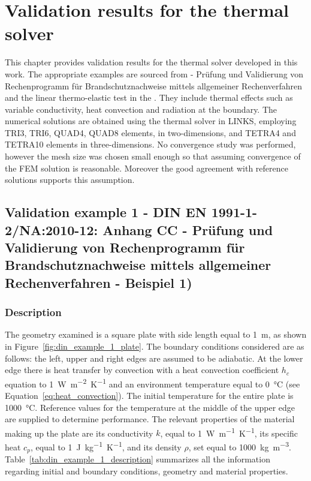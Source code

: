\chapter{Validation results for the thermal solver} \label{ch:val_therm_solver}

This chapter provides validation results for the thermal solver developed in this work.
The appropriate examples are sourced from \cite{DINEN1991_1_2}  - Prüfung und  Validierung von Rechenprogramm für Brand\-schutz\-nach\-weise mittels allgemeiner Rechenverfahren  and the linear thermo-elastic test in the \cite{NAFEMSbenchmarks}.
They include thermal effects such as variable conductivity, heat convection and radiation at the boundary.
The numerical solutions are obtained using the thermal solver in LINKS, employing TRI3, TRI6, QUAD4, QUAD8 elements, in two-dimensions, and TETRA4 and TETRA10 elements in three-dimensions.
No convergence study was performed, however the mesh size was chosen small enough so that assuming convergence of the FEM solution is reasonable.
Moreover the good agreement with reference solutions supports this assumption.

\section{Validation example 1 - DIN EN 1991-1-2/NA:2010-12: Anhang CC - Prüfung und Validierung von Rechenprogramm für Brandschutznachweise mittels allgemeiner Rechenverfahren - Beispiel 1)}

\subsection{Description}

The geometry examined is a square plate with side length equal to \SI{1}{\meter}, as shown in Figure~\ref{fig:din_example_1_plate}.
The boundary conditions considered are as follows: the left, upper and right edges are assumed to be adiabatic.
At the lower edge there is heat transfer by convection with a heat convection coefficient \(h_c\) equation to \SI{1}{\watt\meter^{-2}\kelvin^{-1}} and an environment temperature equal to \SI{0}{\celsius} (see Equation~\ref{eq:heat_convection}).
The initial temperature for the entire plate is \SI{1000}{\celsius}.
Reference values for the temperature at the middle of the upper edge are supplied to determine performance.
The relevant properties of the material making up the plate are its conductivity \(k\), equal to \SI{1}{\watt\meter^{-1}\kelvin^{-1}}, its specific heat \(c_p\), equal to \SI{1}{\joule\kilo\gram^{-1}\kelvin^{-1}}, and its density \(\rho\), set equal to \SI{1000}{\kilo\gram\meter^{-3}}.
Table~\ref{tab:din_example_1_description} summarizes all the information regarding initial and boundary conditions, geometry and material properties.

